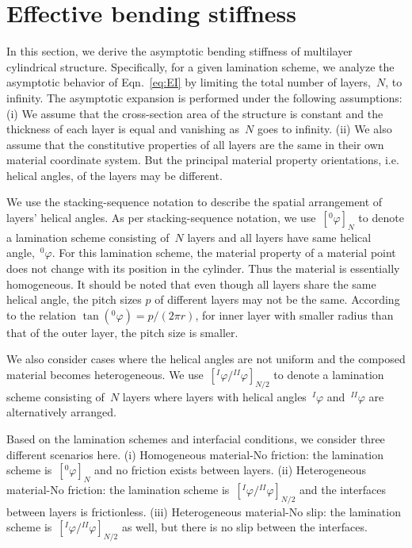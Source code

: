 \documentclass[preprint,10pt,times]{elsarticle}
\numberwithin{equation}{section}
\renewcommand{\>}{$\Rightarrow$}
\begin{document}
\section{Effective bending stiffness}
\label{sec:limit_analysis}
In this section, we derive the asymptotic bending stiffness of multilayer cylindrical structure.
Specifically, for a given lamination scheme, we analyze the asymptotic behavior of Eqn.~\eqref{eq:EI} by limiting the total number of layers,~$N$, to infinity.
The asymptotic expansion is performed under the following assumptions: (i) We assume that the cross-section area of the structure is constant and the thickness of each layer is equal and vanishing as~$N$ goes to infinity. (ii) We also assume that the constitutive properties of all layers are the same in their own material coordinate system. But the principal material property orientations, i.e. helical angles, of the layers may be different.

We use the stacking-sequence notation to describe the spatial arrangement of layers' helical angles. As per stacking-sequence notation, we use~$[{}^{0}\!\varphi]_N$ to denote a lamination scheme consisting of~$N$ layers and all layers have same helical angle,~${}^{0}\!\varphi$.
For this lamination scheme, the material property of a material point does not change with its position in the cylinder. Thus the material is essentially homogeneous.
It should be noted that even though all layers share the same helical angle, the pitch sizes $p$ of different layers may not be the same. According to the relation $\tan{({}^{0}\!\varphi)} = p/(2\pi r )$, for inner layer with smaller radius than that of the outer layer, the pitch size is smaller.


We also consider cases where the helical angles are not uniform and the composed material becomes heterogeneous. We use~$[{}^{I}\!\varphi/{}^{II}\!\varphi]_{N/2}$ to denote a lamination scheme consisting of~$N$ layers where layers with helical angles~${}^{I}\!\varphi$ and~${}^{II}\!\varphi$ are alternatively arranged.

Based on the lamination schemes and interfacial conditions, we consider three different scenarios here. (i) Homogeneous material-No friction: the lamination scheme is~$[{}^{0}\!\varphi]_N$ and no friction exists between layers. (ii) Heterogeneous material-No friction: the lamination scheme is~$[{}^{I}\!\varphi/{}^{II}\!\varphi]_{N/2}$ and the interfaces between layers is frictionless. (iii) Heterogeneous material-No slip: the lamination scheme is~$[{}^{I}\!\varphi/{}^{II}\!\varphi]_{N/2}$ as well, but there is no slip between the interfaces.
\end{document}
